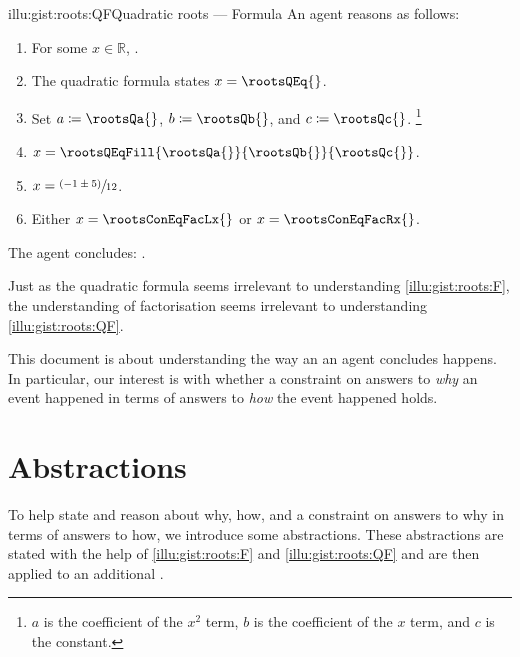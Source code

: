 \begin{note}
  \begin{rscenario}{illu:gist:roots:QF}{Quadratic roots --- Formula}%
    An agent reasons as follows:
    \begin{enumerate}[label=\arabic*., ref=\arabic*]
    \item
      \label{illu:gist:roots:QF:eq}
      For some \(x \in \mathbb{R}\), \rootsConEq{}.
    \item
      \label{illu:gist:roots:QF:qf}
      The quadratic formula states \(x = \rootsQEq{}\).
    \item
      \label{illu:gist:roots:QF:subs}
      Set \(a \coloneq \rootsQa{}\), \(b \coloneq \rootsQb{}\), and \(c \coloneq \rootsQc{}\).%
      \footnote{
        \(a\) is the coefficient of the \(x^{2}\) term, \(b\) is the coefficient of the \(x\) term, and \(c\) is the constant.
      }
    \item
      \label{illu:gist:roots:QF:qf-subs}
      \(x = \rootsQEqFill{\rootsQa{}}{\rootsQb{}}{\rootsQc{}}\).
    \item
      \label{illu:gist:roots:QF:qf:1}
      \(x = \sfrac{(- 1 \pm 5)}{12}\).
    \item
      \label{illu:gist:roots:QF:qf:done}
      Either \(x = \rootsConEqFacLx{}\) or \(x = \rootsConEqFacRx{}\).
    \end{enumerate}
    The agent concludes:
    \rootsCon{}.
  \end{rscenario}

  \noindent%
  Just as the quadratic formula seems irrelevant to understanding \autoref{illu:gist:roots:F}, the \agents{} understanding of factorisation seems irrelevant to understanding \autoref{illu:gist:roots:QF}.
\end{note}


\begin{note}
  This document is about understanding the way an  an agent concludes happens.
  In particular, our interest is with whether a constraint on answers to \emph{why} an event happened in terms of answers to \emph{how} the event happened holds.
\end{note}


\section{Abstractions}


\begin{note}
  To help state and reason about why, how, and a constraint on answers to why in terms of answers to how, we introduce some abstractions.
  These abstractions are stated with the help of  \ref{illu:gist:roots:F} and \ref{illu:gist:roots:QF} and are then applied to an additional \scen{}.
\end{note}


